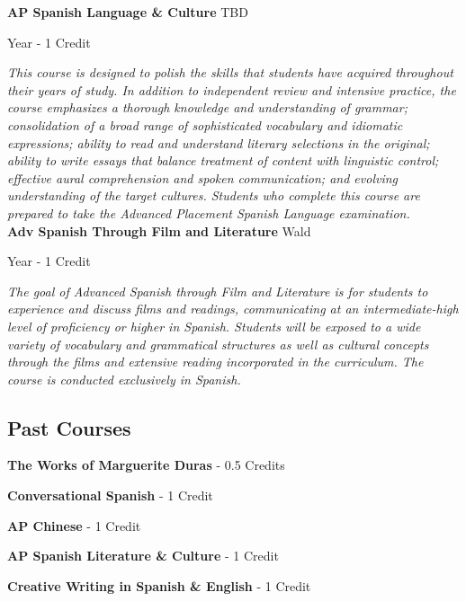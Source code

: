 \noindent\textbf{AP Spanish Language \& Culture} \hfill TBD

\noindent Year - 1 Credit

\vspace{1mm}\emph{This course is designed to polish the skills that students have acquired throughout their years of study. In addition to independent review and intensive practice, the course emphasizes a thorough knowledge and understanding of grammar; consolidation of a broad range of sophisticated vocabulary and idiomatic expressions; ability to read and understand literary selections in the original; ability to write essays that balance treatment of content with linguistic control; effective aural comprehension and spoken communication; and evolving understanding of the target cultures. Students who complete this course are prepared to take the Advanced Placement Spanish Language examination.}\\

\noindent\textbf{Adv Spanish Through Film and Literature} \hfill Wald

\noindent Year - 1 Credit

\vspace{1mm}\emph{The goal of Advanced Spanish through Film and Literature is for students to experience and discuss films and readings, communicating at an intermediate-high level of proficiency or higher in Spanish.  Students will be exposed to a wide variety of vocabulary and grammatical structures as well as cultural concepts through the films and extensive reading incorporated in the curriculum.  The course is conducted exclusively in Spanish. }\\

\subsection{Past Courses}
\noindent\textbf{The Works of Marguerite Duras}  - 0.5 Credits

\vspace{3mm}\noindent\textbf{Conversational Spanish}  - 1 Credit

\vspace{3mm}\noindent\textbf{AP Chinese}  - 1 Credit

\vspace{3mm}\noindent\textbf{AP Spanish Literature \& Culture}  - 1 Credit

\vspace{3mm}\noindent\textbf{Creative Writing in Spanish \& English}  - 1 Credit

